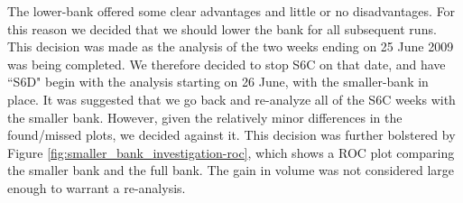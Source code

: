 The lower-bank offered some clear advantages and little or no disadvantages. For this reason we decided that we should lower the bank for all subsequent runs. This decision was made as the analysis of the two weeks ending on 25 June 2009 was being completed. We therefore decided to stop S6C on that date, and have ``S6D" begin with the analysis starting on 26 June, with the smaller-bank in place. It was suggested that we go back and re-analyze all of the S6C weeks with the smaller bank. However, given the relatively minor differences in the found/missed plots, we decided against it. This decision was further bolstered by Figure \ref{fig:smaller_bank_investigation-roc}, which shows a ROC plot comparing the smaller bank and the full bank. The gain in volume was not considered large enough to warrant a re-analysis.

\begin{figure}[p]
\center
{}

\end{figure}
